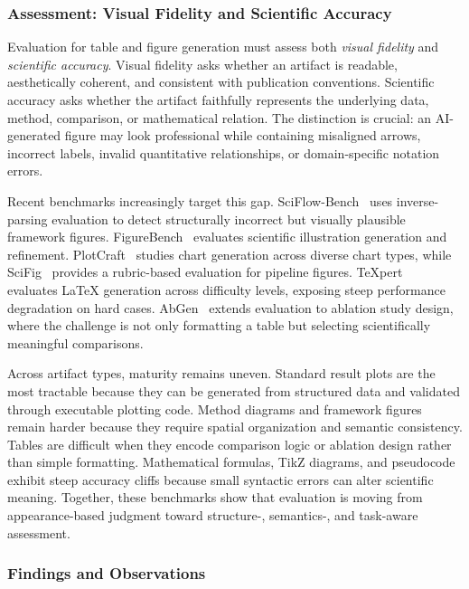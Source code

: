 \subsubsection{Assessment: Visual Fidelity and Scientific Accuracy}
\label{sec:s4_eval}

Evaluation for table and figure generation must assess both \emph{visual fidelity} and \emph{scientific accuracy}. Visual fidelity asks whether an artifact is readable, aesthetically coherent, and consistent with publication conventions. Scientific accuracy asks whether the artifact faithfully represents the underlying data, method, comparison, or mathematical relation. The distinction is crucial: an AI-generated figure may look professional while containing misaligned arrows, incorrect labels, invalid quantitative relationships, or domain-specific notation errors.

Recent benchmarks increasingly target this gap. SciFlow-Bench~\cite{scifigbench2026} uses inverse-parsing evaluation to detect structurally incorrect but visually plausible framework figures. FigureBench~\cite{autofigure2026iclr} evaluates scientific illustration generation and refinement. PlotCraft~\cite{plotcraft2025} studies chart generation across diverse chart types, while SciFig~\cite{scifig2026} provides a rubric-based evaluation for pipeline figures. TeXpert~\cite{texpert2025} evaluates LaTeX generation across difficulty levels, exposing steep performance degradation on hard cases. AbGen~\cite{abgen2025} extends evaluation to ablation study design, where the challenge is not only formatting a table but selecting scientifically meaningful comparisons.

Across artifact types, maturity remains uneven. Standard result plots are the most tractable because they can be generated from structured data and validated through executable plotting code. Method diagrams and framework figures remain harder because they require spatial organization and semantic consistency. Tables are difficult when they encode comparison logic or ablation design rather than simple formatting. Mathematical formulas, TikZ diagrams, and pseudocode exhibit steep accuracy cliffs because small syntactic errors can alter scientific meaning. Together, these benchmarks show that \Sfour evaluation is moving from appearance-based judgment toward structure-, semantics-, and task-aware assessment.



\subsubsection{Findings and Observations}
\label{sec:s4_findings}

